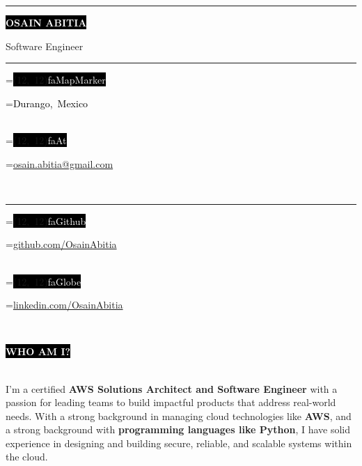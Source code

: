 \documentclass[10pt,A4]{article}
\newcommand*{\vcenteredhbox}[1]{\begingroup
	\setbox0=\hbox{#1}\parbox{\wd0}{\box0}\endgroup}
\newcommand{\icon}[2]{\colorbox{black}{\makebox(#2, #2){\textcolor{white}{\large\csname fa#1\endcsname}}}}	%
\newcommand{\icontext}[3]{ 						%
	\vcenteredhbox{\icon{#1}{#2}}\hspace{0.2cm}\vcenteredhbox{\textcolor{black}{#3}}
}
\newcounter{a}
\newcounter{b}
\newcounter{c}
\newcommand{\cvsection}[1] {
	\textcolor{white}{\MakeUppercase{\textbf{#1}}}
}
\newcommand{\cvsect}[1]{
	\colorbox{black}{{\cvsection{#1}}}\\\\%
}
\begin{document}
	
	\begin{minipage}[t]{0.45\textwidth}\hrule height 0pt width 0pt%
		\colorbox{black}{{\HUGE\textcolor{white}{\textbf{\MakeUppercase{Osain Abitia}}}}}%
		
		\vspace{1mm}\LARGE{Software Engineer}
	\end{minipage}%
	\begin{minipage}[t]{0.3\textwidth}\hrule height 0pt width 0pt%
		\small%
		\icontext{MapMarker}{12}{Durango, Mexico}\\
		\icontext{At}{12}{\href{mailto:osain.abitia@gmail.com}{osain.abitia@gmail.com}}\\	
	\end{minipage}%
	\begin{minipage}[t]{0.3\textwidth}\hrule height 0pt width 0pt%
		\small%
		\icontext{Github}{12}{\href{https://github.com/OsainAbitia}{github.com/OsainAbitia}}\\
		\icontext{Globe}{12}{\href{https://www.linkedin.com/in/osain-abitia/}{linkedin.com/OsainAbitia}}\\
	\end{minipage}%
	
	\small%
	\vspace{1cm}
	
	
	\cvsect{Who Am I?}%
	\begin{minipage}[t]{1\textwidth}%
		I'm a certified \textbf{AWS Solutions Architect and Software Engineer} with a passion for 
		leading teams to build impactful products that address real-world needs. With a
		strong background in managing cloud technologies like \textbf{AWS}, and a strong background
		with \textbf{programming languages like Python}, I have solid experience in designing and building secure,
		reliable, and scalable systems within the cloud.
	\end{minipage}%
	\hfill
	\vspace{0.5cm}
	
	
\end{document}
